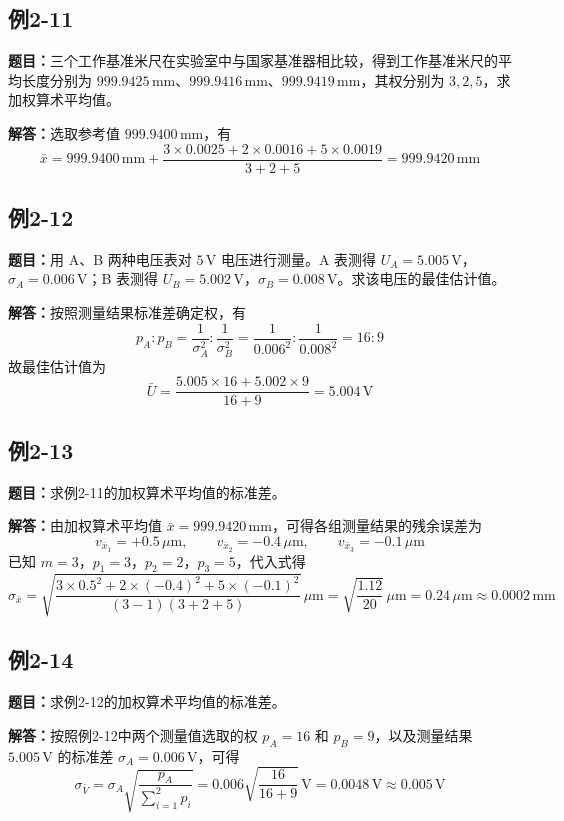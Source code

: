 \documentclass[UTF8,zihao=-4]{ctexart}
\newcommand{\problem}[1]{\subsection*{#1}}
\newcommand{\timu}{\noindent\textbf{题目：}}
\newcommand{\jieda}{\noindent\textbf{解答：}}
\begin{document}
\problem{例2-11}
\timu 三个工作基准米尺在实验室中与国家基准器相比较，得到工作基准米尺的平均长度分别为 $999.9425\,\mathrm{mm}$、$999.9416\,\mathrm{mm}$、$999.9419\,\mathrm{mm}$，其权分别为 $3,2,5$，求加权算术平均值。

\jieda 选取参考值 $999.9400\,\mathrm{mm}$，有
\begin{equation*}
    \bar{x}=999.9400\,\mathrm{mm}+\frac{3\times0.0025+2\times0.0016+5\times0.0019}{3+2+5}
    =999.9420\,\mathrm{mm}
\end{equation*}

\problem{例2-12}
\timu 用 A、B 两种电压表对 $5\,\mathrm{V}$ 电压进行测量。A 表测得 $U_A=5.005\,\mathrm{V}$，$\sigma_A=0.006\,\mathrm{V}$；B 表测得 $U_B=5.002\,\mathrm{V}$，$\sigma_B=0.008\,\mathrm{V}$。求该电压的最佳估计值。

\jieda 按照测量结果标准差确定权，有
\begin{equation*}
    p_A:p_B=\frac{1}{\sigma_A^2}:\frac{1}{\sigma_B^2}
    =\frac{1}{0.006^2}:\frac{1}{0.008^2}=16:9
\end{equation*}
故最佳估计值为
\begin{equation*}
    \bar{U}=\frac{5.005\times16+5.002\times9}{16+9}=5.004\,\mathrm{V}
\end{equation*}

\problem{例2-13}
\timu 求例2-11的加权算术平均值的标准差。

\jieda 由加权算术平均值 $\bar{x}=999.9420\,\mathrm{mm}$，可得各组测量结果的残余误差为
\begin{equation*}
    v_{\bar{x}_1}=+0.5\,\mu\mathrm{m},\qquad
    v_{\bar{x}_2}=-0.4\,\mu\mathrm{m},\qquad
    v_{\bar{x}_3}=-0.1\,\mu\mathrm{m}
\end{equation*}
已知 $m=3$，$p_1=3$，$p_2=2$，$p_3=5$，代入式得
\begin{equation*}
    \sigma_{\bar{x}}
    =\sqrt{\frac{3\times0.5^2+2\times(-0.4)^2+5\times(-0.1)^2}{(3-1)(3+2+5)}}\,\mu\mathrm{m}
    =\sqrt{\frac{1.12}{20}}\,\mu\mathrm{m}=0.24\,\mu\mathrm{m}\approx0.0002\,\mathrm{mm}
\end{equation*}

\problem{例2-14}
\timu 求例2-12的加权算术平均值的标准差。

\jieda 按照例2-12中两个测量值选取的权 $p_A=16$ 和 $p_B=9$，以及测量结果 $5.005\,\mathrm{V}$ 的标准差 $\sigma_A=0.006\,\mathrm{V}$，可得
\begin{equation*}
    \sigma_{\bar{V}}=\sigma_A\sqrt{\frac{p_A}{\sum_{i=1}^{2}p_i}}
    =0.006\sqrt{\frac{16}{16+9}}\,\mathrm{V}=0.0048\,\mathrm{V}\approx0.005\,\mathrm{V}
\end{equation*}
\end{document}
